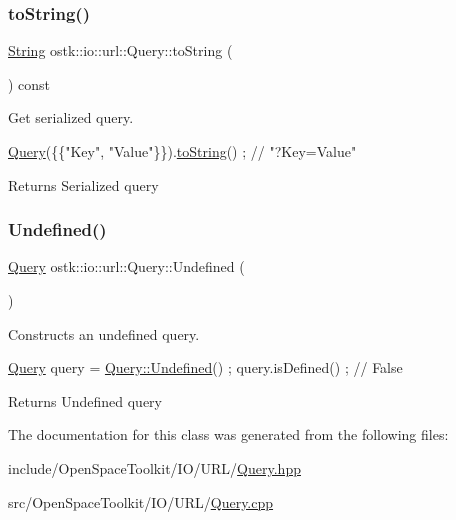 \subsubsection{\texorpdfstring{to\+String()}{toString()}}
{\footnotesize\ttfamily \hyperlink{namespaceostk_1_1io_a95d49b120613a7610cb1b4f03b1116b6}{String} ostk\+::io\+::url\+::\+Query\+::to\+String (\begin{DoxyParamCaption}{ }\end{DoxyParamCaption}) const}



Get serialized query. 


\begin{DoxyCode}
\hyperlink{classostk_1_1io_1_1url_1_1_query_a10299b6b445c39886d6b689c14364fe1}{Query}(\{\{\textcolor{stringliteral}{"Key"}, \textcolor{stringliteral}{"Value"}\}\}).\hyperlink{classostk_1_1io_1_1url_1_1_query_aca282853530302e594b16700c83169d9}{toString}() ; \textcolor{comment}{// "?Key=Value"}
\end{DoxyCode}


\begin{DoxyReturn}{Returns}
Serialized query 
\end{DoxyReturn}
\mbox{\label{classostk_1_1io_1_1url_1_1_query_a25f41e04f41e40fd63519e377829323f}} 
\subsubsection{\texorpdfstring{Undefined()}{Undefined()}}
{\footnotesize\ttfamily \hyperlink{classostk_1_1io_1_1url_1_1_query}{Query} ostk\+::io\+::url\+::\+Query\+::\+Undefined (\begin{DoxyParamCaption}{ }\end{DoxyParamCaption})\hspace{0.3cm}{\ttfamily [static]}}



Constructs an undefined query. 


\begin{DoxyCode}
\hyperlink{classostk_1_1io_1_1url_1_1_query_a10299b6b445c39886d6b689c14364fe1}{Query} query = \hyperlink{classostk_1_1io_1_1url_1_1_query_a25f41e04f41e40fd63519e377829323f}{Query::Undefined}() ;
query.isDefined() ; \textcolor{comment}{// False}
\end{DoxyCode}


\begin{DoxyReturn}{Returns}
Undefined query 
\end{DoxyReturn}


The documentation for this class was generated from the following files\+:\begin{DoxyCompactItemize}
\item 
include/\+Open\+Space\+Toolkit/\+I\+O/\+U\+R\+L/\hyperlink{_query_8hpp}{Query.\+hpp}\item 
src/\+Open\+Space\+Toolkit/\+I\+O/\+U\+R\+L/\hyperlink{_query_8cpp}{Query.\+cpp}\end{DoxyCompactItemize}

